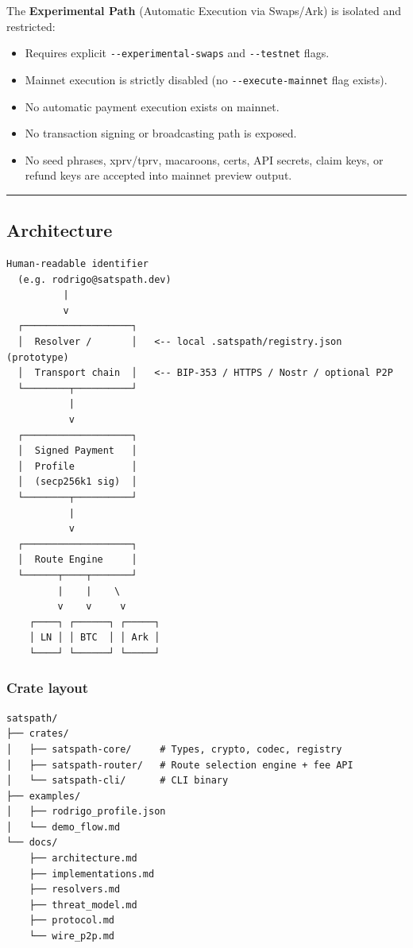 \documentclass[
]{article}
\providecommand{\tightlist}{%
  \setlength{\itemsep}{0pt}\setlength{\parskip}{0pt}}
\begin{document}
The \textbf{Experimental Path} (Automatic Execution via Swaps/Ark) is
isolated and restricted:

\begin{itemize}
\tightlist
\item
  Requires explicit \texttt{-\/-experimental-swaps} and
  \texttt{-\/-testnet} flags.
\item
  Mainnet execution is strictly disabled (no
  \texttt{-\/-execute-mainnet} flag exists).
\item
  No automatic payment execution exists on mainnet.
\item
  No transaction signing or broadcasting path is exposed.
\item
  No seed phrases, xprv/tprv, macaroons, certs, API secrets, claim keys,
  or refund keys are accepted into mainnet preview output.
\end{itemize}

\begin{center}\rule{0.5\linewidth}{0.5pt}\end{center}

\hypertarget{architecture}{%
\subsection{Architecture}\label{architecture}}

\begin{verbatim}
Human-readable identifier
  (e.g. rodrigo@satspath.dev)
          |
          v
  ┌───────────────────┐
  │  Resolver /       │   <-- local .satspath/registry.json (prototype)
  │  Transport chain  │   <-- BIP-353 / HTTPS / Nostr / optional P2P
  └────────┬──────────┘
           |
           v
  ┌───────────────────┐
  │  Signed Payment   │
  │  Profile          │
  │  (secp256k1 sig)  │
  └────────┬──────────┘
           |
           v
  ┌───────────────────┐
  │  Route Engine     │
  └──────┬────┬───────┘
         |    |    \
         v    v     v
    ┌────┐ ┌──────┐ ┌─────┐
    │ LN │ │ BTC  │ │ Ark │
    └────┘ └──────┘ └─────┘
\end{verbatim}

\hypertarget{crate-layout}{%
\subsubsection{Crate layout}\label{crate-layout}}

\begin{verbatim}
satspath/
├── crates/
│   ├── satspath-core/     # Types, crypto, codec, registry
│   ├── satspath-router/   # Route selection engine + fee API
│   └── satspath-cli/      # CLI binary
├── examples/
│   ├── rodrigo_profile.json
│   └── demo_flow.md
└── docs/
    ├── architecture.md
    ├── implementations.md
    ├── resolvers.md
    ├── threat_model.md
    ├── protocol.md
    └── wire_p2p.md
\end{verbatim}
\end{document}

